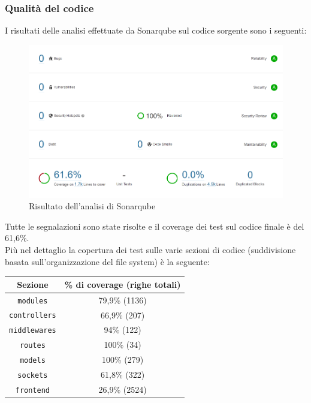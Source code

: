 \subsubsection{Qualità del codice}
I risultati delle analisi effettuate da Sonarqube sul codice sorgente sono i seguenti:
\begin{figure}[H]
    \centering
    \includegraphics[width=\linewidth]{./img/sprint4/sonarqube.png}
    \caption{Risultato dell'analisi di Sonarqube}
\end{figure}
Tutte le segnalazioni sono state risolte e il coverage dei test sul codice finale è del 61,6\%.\\
Più nel dettaglio la copertura dei test sulle varie sezioni di codice (suddivisione basata sull'organizzazione del file system) è la seguente:
\begin{center}
    \begin{tabular}{|c|c|}
        \hline
        \textbf{Sezione} & \textbf{\% di coverage (righe totali)} \\
        \hline
        \texttt{modules} & 79,9\% (1136) \\
        \hline
        \texttt{controllers} & 66,9\% (207) \\
        \hline
        \texttt{middlewares} & 94\% (122) \\
        \hline
        \texttt{routes} & 100\% (34) \\
        \hline
        \texttt{models} & 100\% (279) \\
        \hline
        \texttt{sockets} & 61,8\% (322) \\
        \hline
        \hline
        \texttt{frontend} & 26,9\% (2524) \\
        \hline
    \end{tabular}
\end{center}